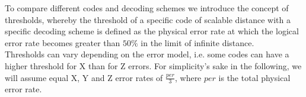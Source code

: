 To compare different codes and decoding schemes
we introduce the concept of thresholds, whereby the threshold
of a specific code of scalable distance with a specific decoding 
scheme is defined as the physical error rate at which the logical
error rate becomes greater than $50\%$ in the limit of infinite 
distance. \\
Thresholds can vary depending on the error model, i.e. 
some codes can have a higher threshold for X than for Z errors.
For simplicity's sake in the following, we will assume equal 
X, Y and Z error rates of $\frac{per}{3}$, where $per$ is the total
physical error rate. 
